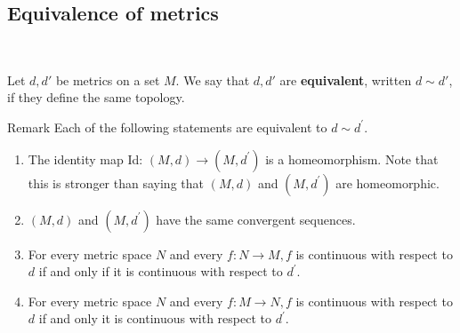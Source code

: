 \documentclass[a4paper]{article}
\begin{document}
\subsection{Equivalence of metrics}\ \vspace{-1.5em}
\begin{definition}
	Let \( d, d' \) be metrics on a set \( M \).
	We say that \( d, d' \) are \textbf{equivalent}, written \( d \sim d' \), if they define the same topology.
\end{definition}

\begin{remark}
	Remark Each of the following statements are equivalent to $d \sim d^{\prime}$.
\begin{enumerate}
    \item The identity map Id: $(M, d) \rightarrow\left(M, d^{\prime}\right)$ is a homeomorphism. Note that this is stronger than saying that $(M, d)$ and $\left(M, d^{\prime}\right)$ are homeomorphic.
    \item $(M, d)$ and $\left(M, d^{\prime}\right)$ have the same convergent sequences.
    \item For every metric space $N$ and every $f: N \rightarrow M, f$ is continuous with respect to $d$ if and only if it is continuous with respect to $d^{\prime}$.
    \item For every metric space $N$ and every $f: M \rightarrow N, f$ is continuous with respect to $d$ if and only it is continuous with respect to $d^{\prime}$.
\end{enumerate}
\end{remark}
\end{document}
